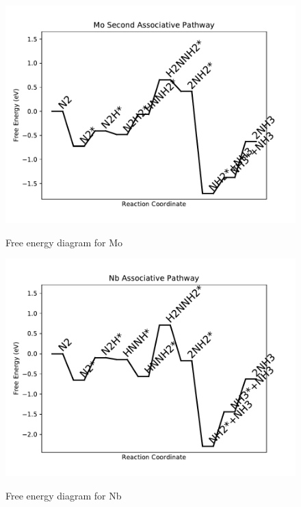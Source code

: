 \documentclass[journal=jacsat,manuscript=article]{achemso}
\begin{document}
\begin{figure}
\includegraphics[width=1\linewidth]{data/plots/Mo_associative_2.pdf}
\label{fig:Mo_associative_2}
\caption{Free energy diagram for Mo}
\end{figure}

\newpage
\begin{figure}
\includegraphics[width=1\linewidth]{data/plots/Nb_associative.pdf}
\label{fig:Nb_associative}
\caption{Free energy diagram for Nb}
\end{figure}
\end{document}
